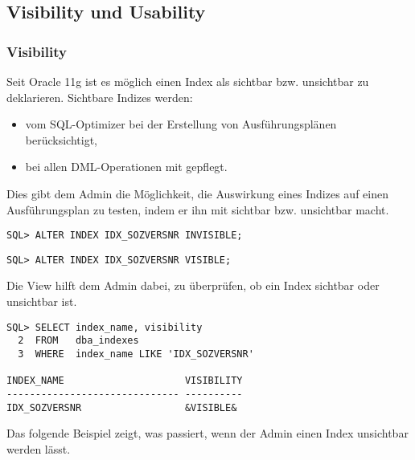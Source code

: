       \subsection{Visibility und Usability}
        \subsubsection{Visibility}
          Seit Oracle 11g ist es möglich einen Index als sichtbar bzw. unsichtbar zu deklarieren. Sichtbare Indizes werden:
          \begin{itemize}
            \item vom SQL-Optimizer bei der Erstellung von Ausführungsplänen berücksichtigt,
            \item bei allen DML-Operationen mit gepflegt.
          \end{itemize}
          Dies gibt dem Admin die Möglichkeit, die Auswirkung eines Indizes auf einen Ausführungsplan zu testen, indem er ihn mit  sichtbar bzw. unsichtbar macht.
          \begin{lstlisting}[caption={Einen Index unsichtbar werden lassen},label=admin323,language=oracle_sql]
SQL> ALTER INDEX IDX_SOZVERSNR INVISIBLE;
          \end{lstlisting}

          \begin{lstlisting}[caption={Und so wird er wieder sichtbar},label=admin324,language=oracle_sql]
SQL> ALTER INDEX IDX_SOZVERSNR VISIBLE;
          \end{lstlisting}
          Die View  hilft dem Admin dabei, zu überprüfen, ob ein Index sichtbar oder unsichtbar ist.
          \begin{lstlisting}[caption={Ist der Index sichtbar oder unsichtbar?},label=admin325,language=oracle_sql]
SQL> SELECT index_name, visibility
  2  FROM   dba_indexes
  3  WHERE  index_name LIKE 'IDX_SOZVERSNR'

INDEX_NAME                     VISIBILITY
------------------------------ ----------
IDX_SOZVERSNR                  &VISIBLE&
          \end{lstlisting}
          Das folgende Beispiel zeigt, was passiert, wenn der Admin einen Index unsichtbar werden lässt.

